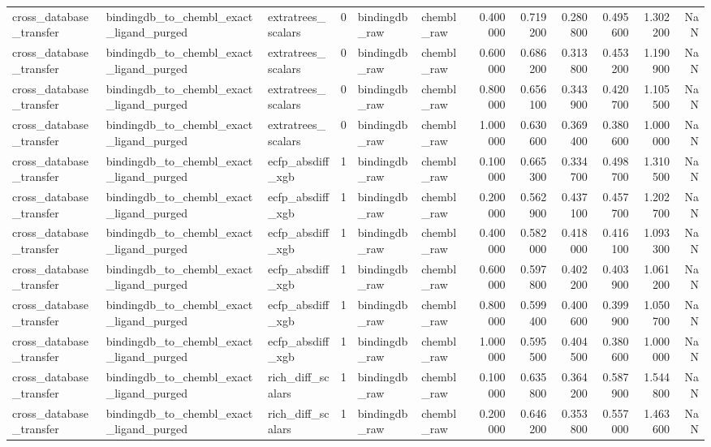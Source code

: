 \begin{longtable}{lllrllrrrrrr}
cross\_database\_transfer & bindingdb\_to\_chembl\_exact\_ligand\_purged & extratrees\_scalars & 0 & bindingdb\_raw & chembl\_raw & 0.400000 & 0.719200 & 0.280800 & 0.495600 & 1.302200 & NaN \\
cross\_database\_transfer & bindingdb\_to\_chembl\_exact\_ligand\_purged & extratrees\_scalars & 0 & bindingdb\_raw & chembl\_raw & 0.600000 & 0.686200 & 0.313800 & 0.453200 & 1.190900 & NaN \\
cross\_database\_transfer & bindingdb\_to\_chembl\_exact\_ligand\_purged & extratrees\_scalars & 0 & bindingdb\_raw & chembl\_raw & 0.800000 & 0.656100 & 0.343900 & 0.420700 & 1.105500 & NaN \\
cross\_database\_transfer & bindingdb\_to\_chembl\_exact\_ligand\_purged & extratrees\_scalars & 0 & bindingdb\_raw & chembl\_raw & 1.000000 & 0.630600 & 0.369400 & 0.380600 & 1.000000 & NaN \\
cross\_database\_transfer & bindingdb\_to\_chembl\_exact\_ligand\_purged & ecfp\_absdiff\_xgb & 1 & bindingdb\_raw & chembl\_raw & 0.100000 & 0.665300 & 0.334700 & 0.498700 & 1.310500 & NaN \\
cross\_database\_transfer & bindingdb\_to\_chembl\_exact\_ligand\_purged & ecfp\_absdiff\_xgb & 1 & bindingdb\_raw & chembl\_raw & 0.200000 & 0.562900 & 0.437100 & 0.457700 & 1.202700 & NaN \\
cross\_database\_transfer & bindingdb\_to\_chembl\_exact\_ligand\_purged & ecfp\_absdiff\_xgb & 1 & bindingdb\_raw & chembl\_raw & 0.400000 & 0.582000 & 0.418000 & 0.416100 & 1.093300 & NaN \\
cross\_database\_transfer & bindingdb\_to\_chembl\_exact\_ligand\_purged & ecfp\_absdiff\_xgb & 1 & bindingdb\_raw & chembl\_raw & 0.600000 & 0.597800 & 0.402200 & 0.403900 & 1.061200 & NaN \\
cross\_database\_transfer & bindingdb\_to\_chembl\_exact\_ligand\_purged & ecfp\_absdiff\_xgb & 1 & bindingdb\_raw & chembl\_raw & 0.800000 & 0.599400 & 0.400600 & 0.399900 & 1.050700 & NaN \\
cross\_database\_transfer & bindingdb\_to\_chembl\_exact\_ligand\_purged & ecfp\_absdiff\_xgb & 1 & bindingdb\_raw & chembl\_raw & 1.000000 & 0.595500 & 0.404500 & 0.380600 & 1.000000 & NaN \\
cross\_database\_transfer & bindingdb\_to\_chembl\_exact\_ligand\_purged & rich\_diff\_scalars & 1 & bindingdb\_raw & chembl\_raw & 0.100000 & 0.635800 & 0.364200 & 0.587900 & 1.544800 & NaN \\
cross\_database\_transfer & bindingdb\_to\_chembl\_exact\_ligand\_purged & rich\_diff\_scalars & 1 & bindingdb\_raw & chembl\_raw & 0.200000 & 0.646200 & 0.353800 & 0.557000 & 1.463600 & NaN \\

\end{longtable}
